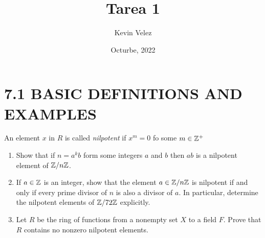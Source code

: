 \documentclass{amsart}
\title{Tarea 1}
\author{Kevin Velez}
\date{Octurbe, 2022}
\begin{document}
\maketitle \thispagestyle{fancy}

\section*{7.1 BASIC DEFINITIONS AND EXAMPLES}

\begin{problem}[13]
    An element $x$ in $R$ is called \emph{nilpotent} if $x^m = 0$ fo some $m \in \mathbb{Z}^+$

    \begin{enumerate}
        \item Show that if $ n = a^k b $ form some integers $a$ and $b$ then $ab$ is a nilpotent element of $ \mathbb{Z} / n\mathbb{Z} $.
        \item If $ a \in \mathbb{Z} $ is an integer, show that the element $ a \in \mathbb{Z} / n\mathbb{Z} $ is nilpotent if and only if  every prime divisor of $n$ is also a divisor of $a$. In particular, determine the nilpotent  elements of $ \mathbb{Z} / 72\mathbb{Z} $ explicitly.
        \item Let $R$ be the ring of functions from a nonempty set $X$ to a field $F$. Prove that $R$  contains no nonzero nilpotent elements. 
    \end{enumerate}
\end{problem}
\end{document}
